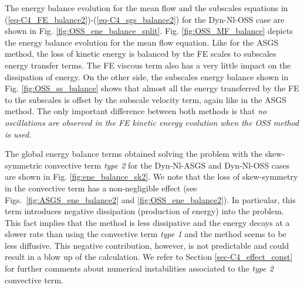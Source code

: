 
The energy balance evolution for the mean flow and the subscales equations in (\ref{eq-C4_FE_balance2})-(\ref{eq-C4_sgs_balance2}) for the Dyn-Nl-OSS case are shown in Fig. \ref{fig:OSS_ene_balance_split}. Fig. \ref{fig:OSS_MF_balance} depicts the energy balance evolution for the mean flow equation. Like for the ASGS method, the loss of kinetic energy is balanced by the FE scales to subscales energy transfer terms. The FE viscous term also has a very little impact on the dissipation of energy. On the other side, the subscales energy balance shown in Fig. \ref{fig:OSS_ss_balance} shows that almost all the energy transferred by the FE to the subscales is offset by the subscale velocity term,
again like in the ASGS method.
The only important difference between both methods is that \emph{no oscillations are observed in the FE kinetic energy evolution when the OSS method is used.}


The global energy balance terms obtained solving the problem with the skew-symmetric convective term \textit{type 2} for the Dyn-Nl-ASGS and Dyn-Nl-OSS cases are shown in Fig. \ref{fig:ene_balance_sk2}. We note that the loss of skew-symmetry in the convective term has a non-negligible effect (see Figs.~\ref{fig:ASGS_ene_balance2} and \ref{fig:OSS_ene_balance2}). In particular, this term introduces negative dissipation (production of energy) into the problem. %
This fact implies that the method is less dissipative and the energy decays at a slower rate than using the convective term \textit{type 1} and the method seems to be less diffusive. This negative contribution, however, is not predictable and could result in a blow up of the calculation. We refer to Section \ref{sec-C4_effect_const} for further comments about numerical instabilities associated to the \textit{type 2} convective term.%

